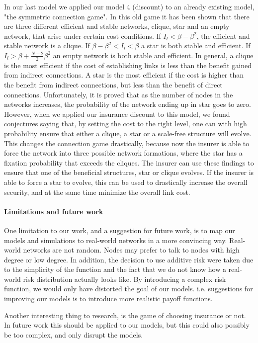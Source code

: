 In our last model we applied our model 4 (discount) to an already existing model, "the symmetric connection game". In this old game it has been shown that there are three different efficient and stable networks, clique, star and an empty network, that arise under certain cost conditions. If $I_{l}<\beta-\beta^{2}$, the efficient and stable network is a clique. If $\beta-\beta^{2}<I_{l}<\beta$ a star is both stable and efficient. If $I_{l}>\beta+\frac{N-2}{2}\beta^{2}$ an empty network is both stable and efficient. In general, a clique is the most efficient if the cost of establishing links is less than the benefit gained from indirect connections. A star is the most efficient if the cost is higher than the benefit from indirect connections, but less than the benefit of direct connections. 
Unfortunately, it is proved that as the number of nodes in the networks increases, the probability of the network ending up in star goes to zero. However, when we applied our insurance discount to this model, we found conjectures saying that, by setting the cost to the right level, one can with high probability ensure that either a clique, a star or a scale-free structure will evolve. This changes the connection game drastically, because now the insurer is able to force the network into three possible network formations, where the star has a fixation probability that exceeds the cliques. The insurer can use these findings to ensure that one of the beneficial structures, star or clique evolves. If the insurer is able to force a star to evolve, this can be used to drastically increase the overall security, and at the same time minimize the overall link cost. 

\paragraph{Limitations and future work}
One limitation to our work, and a suggestion for future work, is to map our models and simulations to real-world networks in a more convincing way. Real-world networks are not random. Nodes may prefer to talk to nodes with high degree or low degree. In addition, the decision to use additive risk were taken due to the simplicity of the function and the fact that we do not know how a real-world risk distribution actually looks like.  By introducing a complex risk function, we would only have distorted the goal of our models. i.e. suggestions for improving our models is to introduce more realistic payoff functions.

Another interesting thing to research, is the game of choosing insurance or not. In future work this should be applied to our models, but this could also possibly be too complex, and only disrupt the models.

